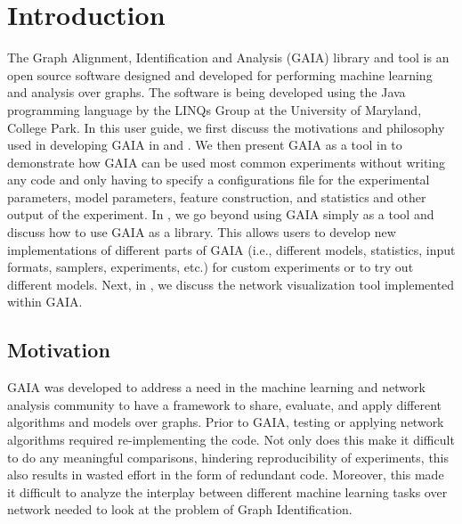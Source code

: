 \chapter{Introduction}

The Graph Alignment, Identification and Analysis (GAIA) library and tool is an open source software
designed and developed for performing machine learning and analysis over graphs.
The software is being developed using the Java programming language
by the LINQs Group at the University of Maryland, College Park.
In this user guide, we first discuss the motivations and philosophy used
in developing GAIA in  and .
We then present GAIA as a tool in  to demonstrate
how GAIA can be used most common experiments without writing
any code and only having to specify a configurations file for the
experimental parameters, model parameters, feature construction, and
statistics and other output of the experiment.
In , we go beyond using GAIA simply as a tool
and discuss how to use GAIA as a library.  This allows users
to develop new implementations of different parts of GAIA (i.e., different models, statistics,
input formats, samplers, experiments, etc.) for custom experiments
or to try out different models.  Next, in , we discuss
the network visualization tool implemented within GAIA.

\section{Motivation}
\label{motivation}
GAIA was developed to address a need in the machine learning and network
analysis community to have a framework to share, evaluate, and apply
different algorithms and models over graphs.  Prior to GAIA, testing or
applying network algorithms required re-implementing the code.
Not only does this make it difficult to do any meaningful comparisons,
hindering reproducibility of experiments,
this also results in wasted effort in the form of redundant code.
Moreover, this made it difficult to analyze the interplay
between different machine learning tasks over network needed
to look at the problem of Graph Identification.

